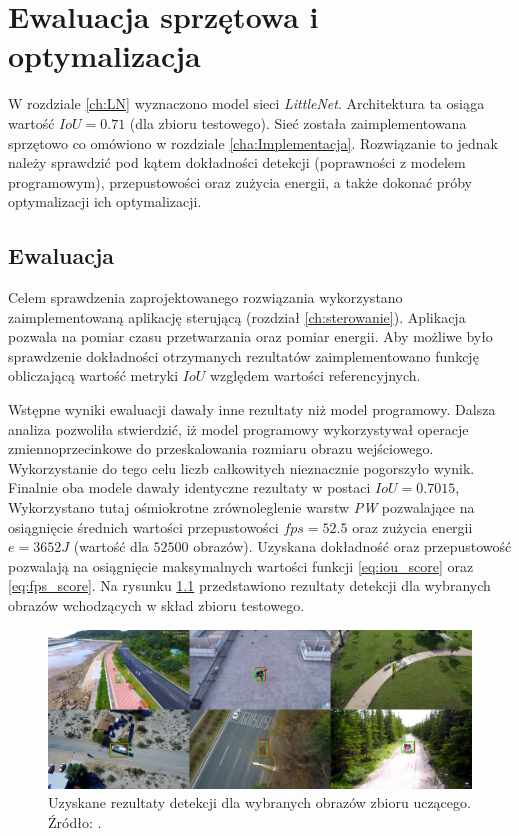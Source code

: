\chapter{Ewaluacja sprzętowa i optymalizacja}
\label{cha:Optymalizacja}

W rozdziale \ref{ch:LN} wyznaczono model sieci \emph{LittleNet}. 
Architektura ta osiąga wartość $IoU = 0.71$ (dla zbioru testowego). 
Sieć została zaimplementowana sprzętowo co omówiono w rozdziale \ref{cha:Implementacja}.
Rozwiązanie to jednak należy sprawdzić pod kątem dokładności detekcji (poprawności z modelem programowym), przepustowości oraz zużycia energii, a także dokonać próby optymalizacji ich optymalizacji. 


\section{Ewaluacja}
Celem sprawdzenia zaprojektowanego rozwiązania wykorzystano zaimplementowaną aplikację sterującą (rozdział \ref{ch:sterowanie}).
Aplikacja pozwala na pomiar czasu przetwarzania oraz pomiar energii.
Aby możliwe było sprawdzenie dokładności otrzymanych rezultatów zaimplementowano funkcję obliczającą wartość metryki $IoU$ względem wartości referencyjnych.

Wstępne wyniki ewaluacji dawały inne rezultaty niż model programowy.
Dalsza analiza pozwoliła stwierdzić, iż model programowy wykorzystywał operacje zmiennoprzecinkowe do przeskalowania rozmiaru obrazu wejściowego.
Wykorzystanie do tego celu liczb całkowitych nieznacznie pogorszyło wynik.
Finalnie oba modele dawały identyczne rezultaty w postaci $IoU = 0.7015$, 
Wykorzystano tutaj ośmiokrotne zrównoleglenie warstw \emph{PW} pozwalające na osiągnięcie średnich wartości przepustowości $fps = 52.5$ oraz zużycia energii $e = 3652 J$ (wartość dla $52 500$ obrazów). 
Uzyskana dokładność oraz przepustowość pozwalają na osiągnięcie maksymalnych wartości funkcji \eqref{eq:iou_score} oraz \eqref{eq:fps_score}.
Na rysunku \ref{fig:results} przedstawiono rezultaty detekcji dla wybranych obrazów wchodzących w skład zbioru testowego.

\begin{figure}
    \centering
    \includegraphics[width=0.9\linewidth]{images/results.png}
    \caption{Uzyskane rezultaty detekcji dla wybranych obrazów zbioru uczącego. 
    Źródło: \cite{dac_sdc_2021}.}
    \label{fig:results}
\end{figure}

